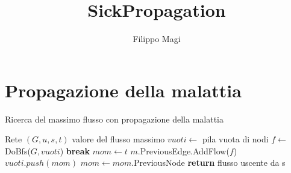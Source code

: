 \documentclass{article}
\title{SickPropagation}
\author{Filippo Magi }
\begin{document}
\maketitle

\section{Propagazione della malattia}
\begin{algorithm}
    \caption{Ricerca del massimo flusso con propagazione della malattia}
    \begin{algorithmic}
        \REQUIRE Rete $(G,u,s,t)$
        \ENSURE valore del flusso massimo
        \STATE $vuoti \leftarrow$ pila vuota di nodi
        \STATE $f \leftarrow$ DoBfs($G,vuoti$)
        \STATE \textbf{break}
        \ENDIF
        \STATE $mom \leftarrow t$
        \STATE $m$.PreviousEdge.AddFlow($f$)
        \STATE $vuoti.push(mom)$
        \ENDIF
        \STATE $mom \leftarrow mom$.PreviousNode
        \ENDWHILE
        \ENDWHILE
        \STATE \textbf{return} flusso uscente da s
    \end{algorithmic}
\end{algorithm}
\end{document}
